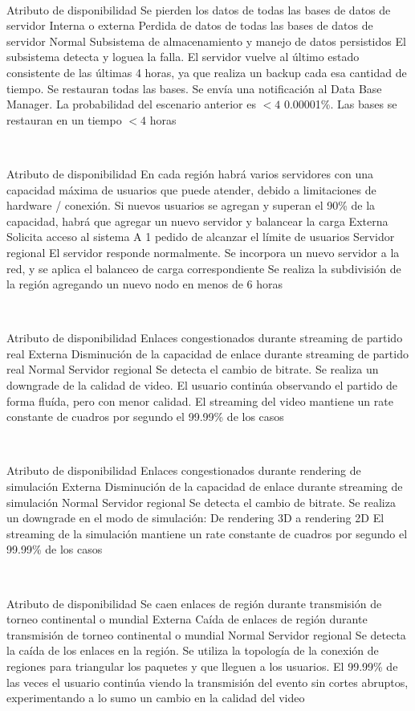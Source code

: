 ~

\escenario
{Atributo de disponibilidad}
{Se pierden los datos de todas las bases de datos de servidor}
{Interna o externa}
{Perdida de datos de todas las bases de datos de servidor}
{Normal}
{Subsistema de almacenamiento y manejo de datos persistidos}
{El subsistema detecta y loguea la falla. El servidor vuelve al último estado consistente de las últimas 4 horas, ya que realiza un backup cada esa cantidad de tiempo. Se restauran todas las bases. Se envía una notificación al Data Base Manager.}
{La probabilidad del escenario anterior es $< 4$ 0.00001\%. Las bases se restauran en un tiempo $< 4$ horas}

~

\escenario
{Atributo de disponibilidad}
{En cada región habrá varios servidores con una capacidad máxima de usuarios que puede atender, debido a limitaciones de hardware / conexión. Si nuevos usuarios se agregan y superan el 90\% de la capacidad, habrá que agregar un nuevo servidor y balancear la carga}
{Externa}
{Solicita acceso al sistema}
{A 1 pedido de alcanzar el límite de usuarios}
{Servidor regional}
{El servidor responde normalmente. Se incorpora un nuevo servidor a la red, y se aplica el balanceo de carga correspondiente}
{Se realiza la subdivisión de la región agregando un nuevo nodo en menos de 6 horas}

~

\escenario
{Atributo de disponibilidad}
{Enlaces congestionados durante streaming de partido real}
{Externa}
{Disminución de la capacidad de enlace durante streaming de partido real}
{Normal}
{Servidor regional}
{Se detecta el cambio de bitrate. Se realiza un downgrade de la calidad de video. El usuario continúa observando el partido de forma fluída, pero con menor calidad.}
{El streaming del video mantiene un rate constante de cuadros por segundo el 99.99\% de los casos}	

~

\escenario
{Atributo de disponibilidad}
{Enlaces congestionados durante rendering de simulación}
{Externa}
{Disminución de la capacidad de enlace durante streaming de simulación}
{Normal}
{Servidor regional}
{Se detecta el cambio de bitrate. Se realiza un downgrade en el modo de simulación: De rendering 3D a rendering 2D}
{El streaming de la simulación mantiene un rate constante de cuadros por segundo el 99.99\% de los casos}

~

\escenario
{Atributo de disponibilidad}
{Se caen enlaces de región durante transmisión de torneo continental o mundial}
{Externa}
{Caída de enlaces de región durante transmisión de torneo continental o mundial}
{Normal}
{Servidor regional}
{Se detecta la caída de los enlaces en la región. Se utiliza la topología de la conexión de regiones para triangular los paquetes y que lleguen a los usuarios.}
{El 99.99\% de las veces el usuario continúa viendo la transmisión del evento sin cortes abruptos, experimentando a lo sumo un cambio en la calidad del video}

